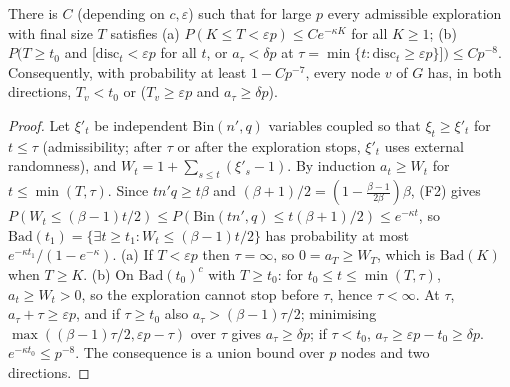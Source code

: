 \begin{lemma}[dichotomy]\label{lem:er-l1}
There is $C$ (depending on $c,\varepsilon$) such that for large $p$ every
admissible exploration with final size $T$ satisfies
(a) $P(K\le T<\varepsilon p)\le Ce^{-\kappa K}$ for all $K\ge1$;
(b) $P\big(T\ge t_0$ and [$\mathrm{disc}_t<\varepsilon p$ for all $t$, or
$a_\tau<\delta p$ at $\tau=\min\{t:\mathrm{disc}_t\ge\varepsilon p\}$]$\big)\le Cp^{-8}$.
Consequently, with probability at least $1-Cp^{-7}$, every node $v$ of $G$ has, in
both directions, $T_v<t_0$ or ($T_v\ge\varepsilon p$ and $a_\tau\ge\delta p$).
\end{lemma}
\begin{proof}
Let $\xi'_t$ be independent $\mathrm{Bin}(n',q)$ variables coupled so that
$\xi_t\ge\xi'_t$ for $t\le\tau$ (admissibility; after $\tau$ or after the
exploration stops, $\xi'_t$ uses external randomness), and
$W_t=1+\sum_{s\le t}(\xi'_s-1)$. By induction $a_t\ge W_t$ for
$t\le\min(T,\tau)$. Since $tn'q\ge t\beta$ and
$(\beta+1)/2=(1-\frac{\beta-1}{2\beta})\beta$, (F2) gives
$P(W_t\le(\beta-1)t/2)\le P(\mathrm{Bin}(tn',q)\le t(\beta+1)/2)\le e^{-\kappa t}$,
so $\mathrm{Bad}(t_1)=\{\exists t\ge t_1:W_t\le(\beta-1)t/2\}$ has probability at
most $e^{-\kappa t_1}/(1-e^{-\kappa})$.
(a) If $T<\varepsilon p$ then $\tau=\infty$, so $0=a_T\ge W_T$, which is
$\mathrm{Bad}(K)$ when $T\ge K$.
(b) On $\mathrm{Bad}(t_0)^c$ with $T\ge t_0$: for $t_0\le t\le\min(T,\tau)$,
$a_t\ge W_t>0$, so the exploration cannot stop before $\tau$, hence
$\tau<\infty$. At $\tau$, $a_\tau+\tau\ge\varepsilon p$, and if $\tau\ge t_0$
also $a_\tau>(\beta-1)\tau/2$; minimising $\max((\beta-1)\tau/2,\varepsilon p-\tau)$
over $\tau$ gives $a_\tau\ge\delta p$; if $\tau<t_0$, $a_\tau\ge\varepsilon p-t_0\ge\delta p$.
$e^{-\kappa t_0}\le p^{-8}$. The consequence is a union bound over $p$ nodes and
two directions.
\end{proof}

